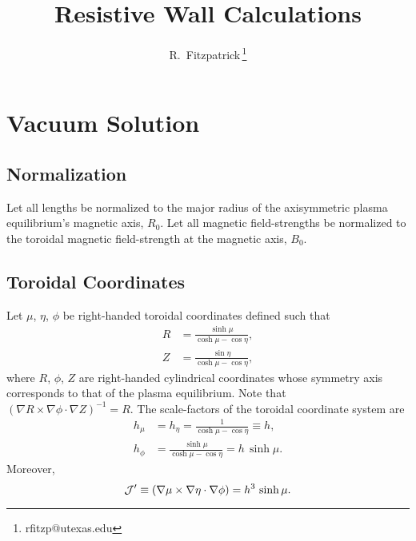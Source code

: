\documentclass[12pt,prb,aps,notitlepage]{revtex4-1}
\begin{document}
\title{Resistive Wall Calculations}
\author{R.~Fitzpatrick\,\footnote{rfitzp@utexas.edu}}
\begin{abstract}
\end{abstract}
\maketitle

\section{Vacuum Solution}

\subsection{Normalization}
Let all lengths be normalized to the major radius of the  axisymmetric plasma equilibrium's magnetic axis, $R_0$. Let all
magnetic field-strengths be normalized to the toroidal magnetic field-strength at the magnetic axis, $B_0$.

\subsection{Toroidal Coordinates}
Let $\mu$, $\eta$, $\phi$ be right-handed toroidal coordinates defined such that
\begin{align}
R &= \frac{\sinh\mu}{\cosh\mu-\cos\eta},\\[0.5ex]
Z&=\frac{\sin\eta}{\cosh\mu-\cos\eta},
\end{align}
where $R$, $\phi$, $Z$ are right-handed cylindrical coordinates whose symmetry axis corresponds to that of the plasma equilibrium. 
Note that $(\nabla R\times \nabla\phi\cdot\nabla Z)^{-1}=R$. 
The scale-factors of the toroidal coordinate system are
\begin{align}
h_\mu&=h_\eta= \frac{1}{\cosh\mu-\cos\eta}\equiv h,\\[0.5ex]
h_\phi &= \frac{\sinh\mu}{\cosh\mu-\cos\eta} = h\,\sinh\mu.
\end{align}
Moreover, 
\begin{equation}
{\cal J}' \equiv (\nabla\mu\times\nabla\eta\cdot\nabla\phi)= h^3\,\sinh\mu.
\end{equation}
\end{document}
